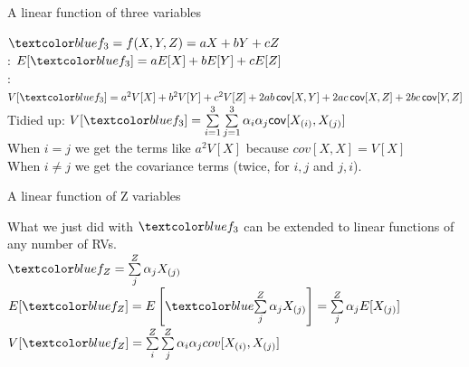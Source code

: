 \documentclass[10pt,sans,english,compress,xcolor=dvipsnames]{beamer}
\begin{document}
\begin{frame}{A linear function of three variables}
\small

$\bbl{f_3 =  f(X,Y,Z) = aX + bY + cZ}$\\

: $E[ \bbl{f_3} ] = a E[X] + b E[Y] + cE[Z]$ \\

: $V[ \bbl{f_3} ] =  a^2 V[X] + b^2 V[Y]  + c^2 V[Z] + 2ab\, \mathsf{cov}[X,Y] + 2ac\, \mathsf{cov}[X,Z] + 2bc\, \mathsf{cov}[Y,Z] $   \\[2ex]

Tidied up: $V[ \bbl{f_3}  ]  = \sum\limits_{i=1}^{3} \sum\limits_{j=1}^{3} \alpha_i \alpha_j \mathsf{cov} [X_{(i)}, X_{(j)}]$\\[2ex]

When $i=j$ we get the terms like $a^2 V[X] $ because $cov[X,X] = V[X]$\\[1ex]
When $i\neq j$ we get the covariance terms (twice, for $i,j$ and $j,i$).\\[1ex]

\end{frame} 




\begin{frame}{A linear function of Z variables}

What we just did with $\bbl{f_3}$ can be extended to linear functions of any number of RVs.\\[1ex]

$\bbl{f_Z =\sum\limits_j^Z \alpha_j X_{(j)} }$\\

$E[ \bbl{f_Z} ] = E\left[ \bbl{\sum\limits_j^Z \alpha_j X_{(j)} } \right] =    \sum\limits_j^Z \alpha_j  E[ X_{(j)}] $ \\[1ex]

$V[ \bbl{f_Z}  ] = \sum\limits_i^Z \sum\limits_j^Z \alpha_i  \alpha_j cov[X_{(i)} , X_{(j)}] $ \\[1ex]


\end{frame} 
\end{document}
